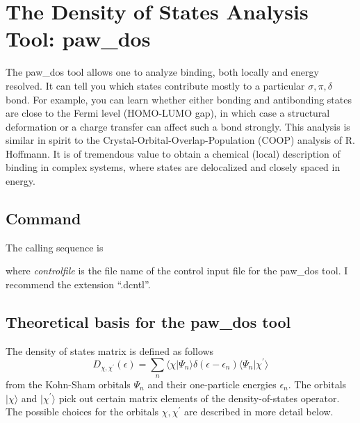 \documentclass[final,12pt]{article}
\begin{document}
{{{{{{%
\newpage
\section{The Density of States Analysis Tool: paw\_dos}
The paw\_dos tool allows one to analyze binding, both locally and energy
resolved. It can tell you which states contribute mostly to a
particular $\sigma, \pi, \delta$ bond. For example, you can learn whether
either bonding and antibonding states are close to the Fermi level
(HOMO-LUMO gap), in which case a structural deformation or a charge
transfer can affect such a bond strongly. This analysis is similar in
spirit to the Crystal-Orbital-Overlap-Population (COOP) analysis of R.
Hoffmann. It is of tremendous value to obtain a chemical (local)
description of binding in complex systems, where states are
delocalized and closely spaced in energy.

\subsection{Command}

The calling sequence is

\bigskip{}\bigskip

\noindent
where {\it controlfile} is the file name of the control input file for
the paw\_dos tool. I recommend the extension ``.dcntl''.


\subsection{Theoretical basis for the paw\_dos tool}

The density of states matrix is defined as follows
\begin{equation}
  D_{\chi,\chi^\prime}(\epsilon)
 =\sum_n
  \langle\chi|\Psi_n\rangle
\delta(\epsilon-\epsilon_n)
\langle\Psi_n|\chi^\prime\rangle
\end{equation}
from the Kohn-Sham orbitals $\Psi_n$ and their one-particle energies
$\epsilon_n$. The orbitals $|\chi\rangle$ and $|\chi^\prime\rangle$
pick out certain matrix elements of the density-of-states
operator. The possible choices for the orbitals $\chi,\chi^\prime$ are
described in more detail below.

}}}}}}
\end{document}
